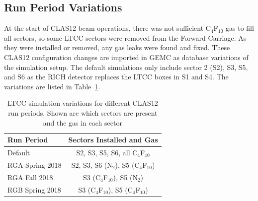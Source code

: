 \subsection{Run Period Variations}

At the start of CLAS12 beam operations, there was not sufficient C$_4$F$_{10}$ gas to fill all sectors, so some
LTCC sectors were removed from the Forward Carriage. As they were installed or removed, any gas leaks were
found and fixed.
These CLAS12 configuration changes are imported in GEMC as database variations of the simulation setup.
The default simulations only include sector 2 (S2), S3, S5, and S6 as the RICH detector replaces the LTCC
boxes in S1 and S4. The variations are listed in Table~\ref{tab:simVariations}.

\begin{table}
	\begin{center}
		\begin{tabular}{| l | c |}
			\hline \hline
			Run Period       & Sectors Installed and Gas \\
			\hline
			Default          & S2, S3, S5, S6, all C$_4$F$_{10}$    \\
			RGA Spring 2018  & S2, S3, S6 (N$_2$), S5 (C$_4$F$_{10}$)  \\
			RGA Fall 2018    & S3 (C$_4$F$_{10}$), S5 (N$_2$)          \\
			RGB Spring 2018  & S3 (C$_4$F$_{10}$), S5 (C$_4$F$_{10}$) \\
			\hline \hline
		\end{tabular}
	\end{center}
	\caption{LTCC simulation variations for different CLAS12 run periods. Shown are which sectors are present
          and the gas in each sector}
	\label{tab:simVariations}
\end{table}
